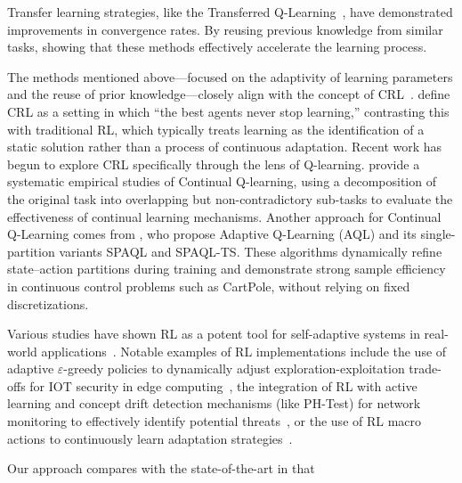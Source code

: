 Transfer learning strategies, like the Transferred Q-Learning~\cite{chen2022transferredqlearning}, 
have demonstrated improvements in convergence rates. By reusing previous knowledge from similar 
tasks, showing that these methods effectively accelerate the learning process.

The methods mentioned above—focused on the adaptivity of learning parameters and the reuse of prior knowledge—closely align with the concept of \ac{CRL}~\cite{khetarpal2022continualreinforcementlearningreview}.
\citet{abel2023definitioncontinualreinforcementlearning} define \ac{CRL} as a setting in which “the best agents never stop learning,” contrasting this with traditional \ac{RL}, which typically treats learning as the identification of a static solution rather than a process of continuous adaptation.
Recent work has begun to explore \ac{CRL} specifically through the lens of Q-learning.
\citet{Bagus2022} provide a systematic empirical studies of Continual Q-learning, using a decomposition of the original task into overlapping but non-contradictory sub-tasks to evaluate the effectiveness of continual learning mechanisms.
Another approach for Continual Q-Learning comes from \citet{araujo2020controladaptiveqlearning}, who propose Adaptive Q-Learning (AQL) and its single-partition variants SPAQL and SPAQL-TS. These algorithms dynamically refine state–action partitions during training and demonstrate strong sample efficiency in continuous control problems such as CartPole, without relying on fixed discretizations.

Various studies have shown \ac{RL} as a potent tool for self-adaptive systems in real-world 
applications~\cite{HENRICHS2022106940}. Notable examples of \ac{RL} implementations 
include the use of adaptive $\varepsilon$-greedy policies to dynamically adjust exploration-exploitation 
trade-offs for \ac{IOT} security in edge computing~\cite{iotdynamicrl}, the integration of \ac{RL} 
with active learning and concept drift detection mechanisms (like PH-Test) for network monitoring to 
effectively identify potential threats~\cite{networkdynamicrl}, or the use of \ac{RL} macro actions to 
continuously learn adaptation strategies~\cite{cardozo23}.

Our approach compares with the state-of-the-art in that 


\endinput
